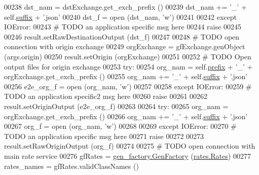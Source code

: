 \begin{DoxyCode}
00238             dst\_nam  = dstExchange.get\_exch\_prefix ()
00239             dst\_nam += \textcolor{stringliteral}{'\_'} + self.\hyperlink{classe2e_1_1_application_a4d824ad36b051d2d629edb314385df0d}{suffix} + \textcolor{stringliteral}{'.json'}
00240             dst\_f = open (dst\_nam, \textcolor{stringliteral}{'w'})
00241             
00242         \textcolor{keywordflow}{except} IOError:
00243             \textcolor{comment}{# TODO an application specific msg here}
00244             \textcolor{keywordflow}{raise}
00245             
00246         result.setRawDestinationOutput (dst\_f)
00247             
00248         \textcolor{comment}{# TODO open connection with origin exchange}
00249         orgExchange = gfExchange.genObject (args.origin)
00250         result.setOrigin (orgExchange)
00251             
00252         \textcolor{comment}{# TODO Open output files for origin exchange}
00253         \textcolor{keywordflow}{try}:
00254             org\_nam  =  self.\hyperlink{classe2e_1_1_application_a027ff25e5409ae17584978a09fc2611a}{prefix} + \textcolor{stringliteral}{'\_'} + orgExchange.get\_exch\_prefix ()
00255             org\_nam += \textcolor{stringliteral}{'\_'} + self.\hyperlink{classe2e_1_1_application_a4d824ad36b051d2d629edb314385df0d}{suffix} + \textcolor{stringliteral}{'.json'}
00256             e2e\_org\_f = open (org\_nam, \textcolor{stringliteral}{'w'})
00257             
00258         \textcolor{keywordflow}{except} IOError:
00259             \textcolor{comment}{# TODO an application specific2 msg here}
00260             \textcolor{keywordflow}{raise}
00261 
00262         result.setOriginOutput (e2e\_org\_f)
00263             
00264         \textcolor{keywordflow}{try}:
00265             org\_nam  = orgExchange.get\_exch\_prefix ()
00266             org\_nam += \textcolor{stringliteral}{'\_'} + self.\hyperlink{classe2e_1_1_application_a4d824ad36b051d2d629edb314385df0d}{suffix} + \textcolor{stringliteral}{'.json'}
00267             org\_f = open (org\_nam, \textcolor{stringliteral}{'w'})
00268             
00269         \textcolor{keywordflow}{except} IOError:
00270             \textcolor{comment}{# TODO an application specific msg here}
00271             \textcolor{keywordflow}{raise}
00272             
00273         result.setRawOriginOutput (org\_f)
00274             
00275         \textcolor{comment}{# TODO open connection with main rate service}
00276         gfRates = \hyperlink{classgen__factory_1_1_gen_factory}{gen\_factory.GenFactory} (\hyperlink{classrates_1_1_rates}{rates.Rates})
00277         rates\_names = gfRates.validClassNames ()

\end{DoxyCode}
